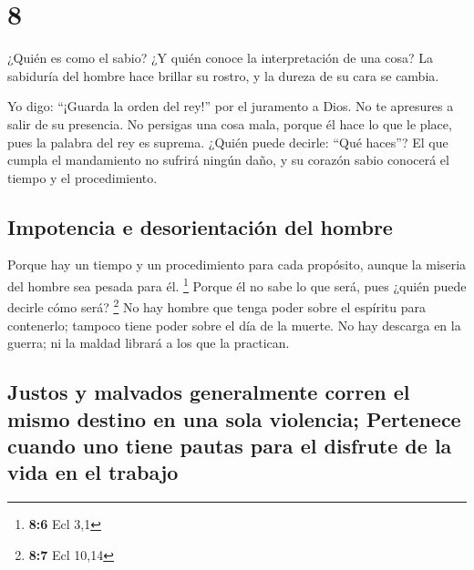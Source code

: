\hypertarget{section-7}{%
\section{8}\label{section-7}}

 ¿Quién es como el sabio? ¿Y quién conoce la
interpretación de una cosa? La sabiduría del hombre hace brillar su
rostro, y la dureza de su cara se cambia.

 Yo digo: ``¡Guarda la orden del rey!'' por el juramento a
Dios.  No te apresures a salir de su presencia. No
persigas una cosa mala, porque él hace lo que le place, 
pues la palabra del rey es suprema. ¿Quién puede decirle: ``Qué haces''?
 El que cumpla el mandamiento no sufrirá ningún daño, y su
corazón sabio conocerá el tiempo y el procedimiento.

\hypertarget{impotencia-e-desorientaciuxf3n-del-hombre}{%
\subsection{Impotencia e desorientación del
hombre}\label{impotencia-e-desorientaciuxf3n-del-hombre}}

 Porque hay un tiempo y un procedimiento para cada
propósito, aunque la miseria del hombre sea pesada para él. \footnote{\textbf{8:6}
  Ecl 3,1}  Porque él no sabe lo que será, pues ¿quién
puede decirle cómo será? \footnote{\textbf{8:7} Ecl 10,14}
 No hay hombre que tenga poder sobre el espíritu para
contenerlo; tampoco tiene poder sobre el día de la muerte. No hay
descarga en la guerra; ni la maldad librará a los que la practican.

\hypertarget{justos-y-malvados-generalmente-corren-el-mismo-destino-en-una-sola-violencia-pertenece-cuando-uno-tiene-pautas-para-el-disfrute-de-la-vida-en-el-trabajo}{%
\subsection{Justos y malvados generalmente corren el mismo destino en
una sola violencia; Pertenece cuando uno tiene pautas para el disfrute
de la vida en el
trabajo}\label{justos-y-malvados-generalmente-corren-el-mismo-destino-en-una-sola-violencia-pertenece-cuando-uno-tiene-pautas-para-el-disfrute-de-la-vida-en-el-trabajo}}


